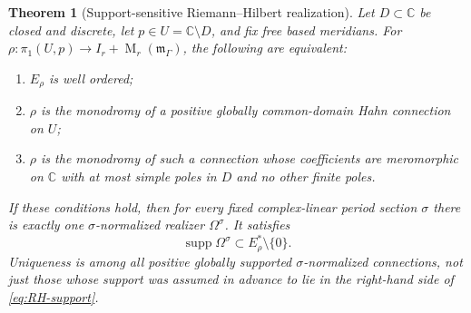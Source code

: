 \documentclass[11pt,letterpaper]{article}
\numberwithin{equation}{section}
\newtheorem{theorem}{Theorem}[section]
\theoremstyle{definition}
\theoremstyle{remark}
\newcommand{\C}{\mathbb C}
\newcommand{\mm}{\mathfrak m}
\newcommand{\supp}{\operatorname{supp}}
\newcommand{\Mat}{\operatorname{M}}
\begin{document}
\begin{theorem}[Support-sensitive Riemann--Hilbert realization]
\label{thm:RH}
Let $D\subset\C$ be closed and discrete, let $p\in U=\C\setminus D$, and fix
free based meridians. For
$\rho:\pi_1(U,p)\to I_r+\Mat_r(\mm_\Gamma)$, the following are equivalent:
\begin{enumerate}[label=\textnormal{(\roman*)}]
 \item $E_\rho$ is well ordered;
 \item $\rho$ is the monodromy of a positive globally common-domain
 Hahn connection on $U$;
 \item $\rho$ is the monodromy of such a connection whose coefficients are
 meromorphic on $\C$ with at most simple poles in $D$ and no other finite
 poles.
\end{enumerate}
If these conditions hold, then for every fixed complex-linear period section
$\sigma$ there is exactly one $\sigma$-normalized realizer $\Omega^\sigma$.
It satisfies
\begin{equation}\label{eq:RH-support}
 \supp\Omega^\sigma\subset E_\rho^*\setminus\{0\}.
\end{equation}
Uniqueness is among all positive globally supported
$\sigma$-normalized connections, not just those whose support was assumed
in advance to lie in the right-hand side of \eqref{eq:RH-support}.
\end{theorem}
\end{document}
